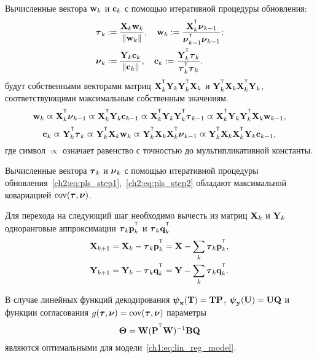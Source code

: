 \documentclass[11pt, a5paper]{dissert}
\begin{document}
\begin{statement}
	Вычисленные вектора $\mathbf{w}_k$ и $\mathbf{c}_k$ с помощью итеративной процедуры обновления:
	\begin{align}
		\btau_k &:= \frac{\bX_k \bw_k}{\|\bw_k\|}, \quad  \bw_k := \frac{\bX_k^{\T} \bnu_{k-1}}{\bnu_{k-1}^{\T} \bnu_{k-1}}; \label{ch2:eq:pls_step1}\\ 
		\bnu_k &:= \frac{\bY_k \bc_k}{\| \bc_k \|}, \quad \bc_k := \frac{\bY_k^{\T} \btau_k}{\btau_k^{\T} \btau_k}. \label{ch2:eq:pls_step2}
	\end{align}
	будут собственными векторами матриц $\bX_k^{\T} \bY_k \bY_k^{\T} \bX_k$ и $\bY_k^{\T} \bX_k \bX_k^{\T} \bY_k$, соответствующими максимальным собственным значениям.
	\begin{equation*}
		\bw_k \varpropto \bX_k^{\T} \bnu_{k-1} \varpropto \bX_k^{\T} \bY_k \bc_{k-1} \varpropto \bX_k^{\T} \bY_k \bY_k^{\T} \btau_{k-1} \varpropto \bX_k^{\T} \bY_k \bY_k^{\T} \bX_k \bw_{k-1},
	\end{equation*}
	\begin{equation*}
		\bc_k \varpropto \bY_k^{\T} \btau_k \varpropto \bY_k^{\T} \bX_k \bw_k \varpropto \bY_k^{\T} \bX_k \bX_k^{\T} \bnu_{k-1} \varpropto \bY_k^{\T} \bX_k \bX_k^{\T} \bY_k \bc_{k-1},
	\end{equation*}
	где символ $\varpropto$ означает равенство с точностью до мультипликативной константы. 
	\label{ch2:stat:eig}
\end{statement}

\begin{statement}
		Вычисленные вектора $\boldsymbol{\tau}_k$ и $\boldsymbol{\nu}_k$ с помощью итеративной процедуры обновления~\eqref{ch2:eq:pls_step1},~\eqref{ch2:eq:pls_step2} обладают максимальной ковариацией $\textnormal{cov}(\boldsymbol{\tau}, \boldsymbol{\nu})$.
\end{statement}

Для перехода на следующий шаг необходимо вычесть из матриц $\mathbf{X}_k$ и $\mathbf{Y}_k$ одноранговые аппроксимации $\btau_k \bp_k^{\T}$ и $\btau_k \bq_k^{\T}$
\begin{align*}
	\bX_{k + 1} &= \bX_{k} - \btau_k \bp_k^{\T} = \bX - \sum_k \btau_k \bp_k^{\T}, \\
	\bY_{k + 1} &= \bY_{k} - \btau_k \bq_k^{\T} = \bY - \sum_k \btau_k \bq_k^{\T}.
\end{align*}

\begin{theorem}
	В случае линейных функций декодирования $\boldsymbol{\psi}_{\mathbf{x}}(\mathbf{T}) = \mathbf{T} \mathbf{P}$, $\boldsymbol{\psi}_{\mathbf{y}} (\mathbf{U}) = \mathbf{U} \mathbf{Q}$ и функции согласования $g(\boldsymbol{\tau}, \boldsymbol{\nu}) = \textnormal{cov}(\boldsymbol{\tau}, \boldsymbol{\nu})$ параметры
	\[
		\bTheta = \bW (\bP^{\T} \bW)^{-1} \bB \bQ
	\]
	являются оптимальными для модели~\eqref{ch1:eq:lin_reg_model}.
\end{theorem}
\end{document}

